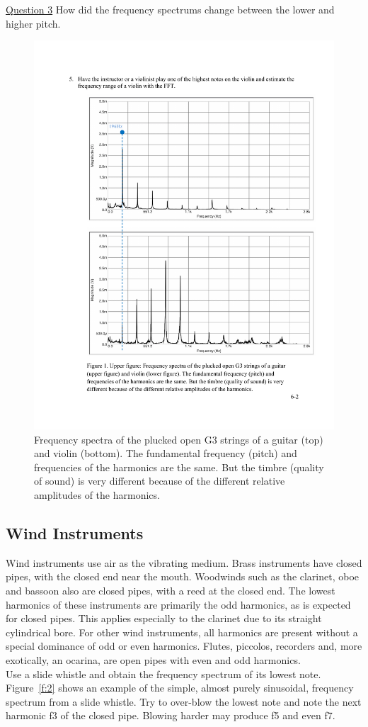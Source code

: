 \documentclass[11pt]{NSF}
\begin{document}
\underline{Question 3} How did the frequency spectrums change between the lower and higher pitch.
%
\begin{figure}[hbtp]
\begin{center}
\includegraphics[width=.6\textwidth]{fig6_1}
\caption{Frequency spectra of the plucked open G3 strings of a guitar
(top) and violin (bottom). The fundamental frequency
(pitch) and frequencies of the harmonics are the same. But the timbre
(quality of sound) is very different because of the different relative
amplitudes of the harmonics.}
\label{f:1}
\end{center}
\end{figure}


\subsection{Wind Instruments} 
Wind instruments use air as the vibrating medium. Brass instruments
have closed pipes, with the closed end near the mouth. Woodwinds such
as the clarinet, oboe and bassoon also are closed pipes, with a reed
at the closed end. The lowest harmonics of these instruments are
primarily the odd harmonics, as is expected for closed pipes. This
applies especially to the clarinet due to its straight cylindrical
bore. For other wind instruments, all harmonics are present without a
special dominance of odd or even harmonics. Flutes, piccolos,
recorders and, more exotically, an ocarina, are open pipes with even
and odd harmonics.  \\

Use a slide whistle and obtain the frequency spectrum of its lowest note.
Figure~\ref{f:2} shows an example of the simple, almost purely sinusoidal, frequency
spectrum from a slide whistle. Try to over-blow the lowest note and note the next
harmonic f3 of the closed pipe. Blowing harder may produce f5 and even f7.
\end{document}
